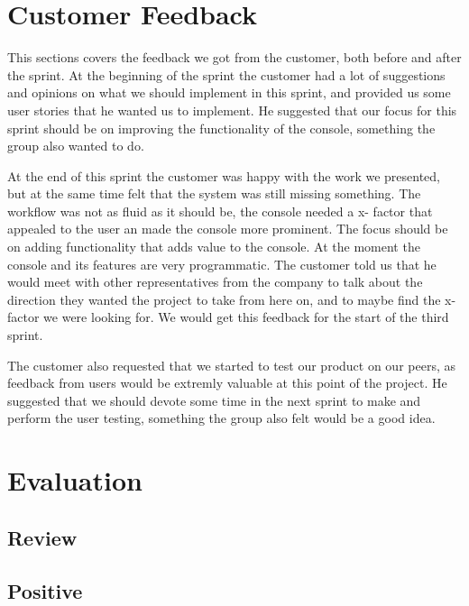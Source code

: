 \section{Customer Feedback}
This sections covers the feedback we got from the customer, both before and after the sprint.
\newline
\newline
At the beginning of the sprint the customer had a lot of suggestions and opinions on what we should implement in this sprint, and provided us some user stories that he wanted us to implement. He suggested that our focus for this sprint should be on improving the functionality of the console, something the group also wanted to do. 

At the end of this sprint the customer was happy with the work we presented, but at the same time felt that the system was still missing something. The workflow was not as fluid as it should be, the console needed a x- factor that appealed to the user an made the console more prominent. The focus should be on adding functionality that adds value to the console. At the moment the console and its features are very programmatic. The customer told us that he would meet with other representatives from the company to talk about the direction they wanted the project to take from here on, and to maybe find the x- factor we were looking for. We would get this feedback for the start of the third sprint.

The customer also requested that we started to test our product on our peers, as feedback from users would be extremly valuable at this point of the project. He suggested that we should devote some time in the next sprint to make and perform the user testing, something the group also felt would be a good idea.

\section{Evaluation}

\subsection{Review}

\subsection{Positive}

